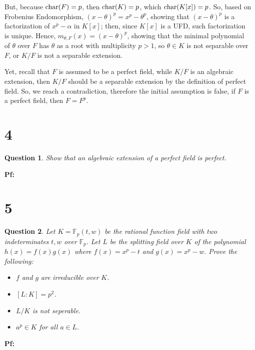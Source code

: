 \documentclass{article}
\newtheorem{question}{Question}
\begin{document}
But, because $\textmd{char}(F)=p$, then $\textmd{char}(K)=p$, which $\textmd{char}(K[x])=p$. So, based on Frobenius Endomorphism, $(x-\theta)^p = x^p-\theta^p$, showing that $(x-\theta)^p$ is a factorization of $x^p-\alpha$ in $K[x]$; then, since $K[x]$ is a UFD, such factorization is unique. Hence, $m_{\theta,F}(x) = (x-\theta)^p$, showing that the minimal polynomial of $\theta$ over $F$ has $\theta$ as a root with multiplicity $p>1$, so $\theta\in K$ is not separable over $F$, or $K/F$ is not a separable extension.

Yet, recall that $F$ is assumed to be a perfect field, while $K/F$ is an algebraic extension, then $K/F$ should be a separable extension by the definition of perfect field. So, we reach a contradiction, therefore the initial assumption is false, if $F$ is a perfect field, then $F=F^p$.

\break

\section*{4}
\begin{myBox}[]{}
    \begin{question}
        Show that an algebraic extension of a perfect field is perfect.
    \end{question}
\end{myBox}

\textbf{Pf:}

\break

\section*{5}
\begin{myBox}[]{}
    \begin{question}
        Let $K=\mathbb{F}_p(t,w)$ be the rational function field with two indeterminates $t,w$ over $\mathbb{F}_p$. Let $L$ be the splitting field over $K$ of the polynomial $h(x)=f(x)g(x)$ where $f(x)=x^p-t$ and $g(x)=x^p-w$. Prove the following:
        \begin{itemize}
            \item[(a)] $f$ and $g$ are irreducible over $K$.
            \item[(b)] $[L:K]=p^2$.
            \item[(c)] $L/K$ is not seperable.
            \item[(d)] $a^p\in K$ for all $a\in L$.
        \end{itemize}
    \end{question}
\end{myBox}

\textbf{Pf:}
\end{document}
